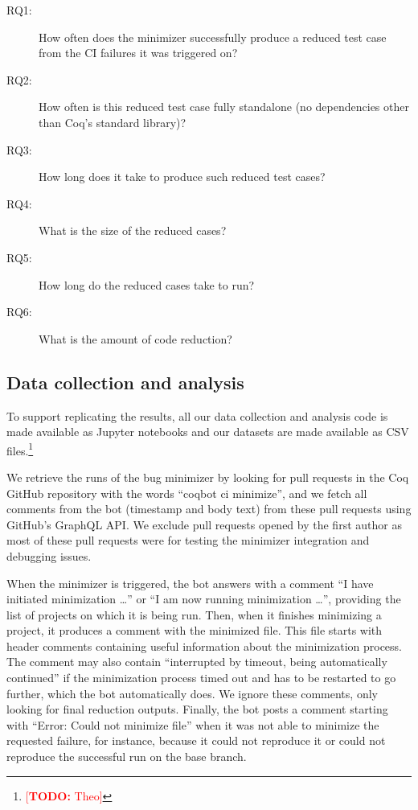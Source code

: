 \documentclass[a4paper,USenglish,cleveref,autoref,thm-restate]{lipics-v2021}
\makeatletter
\newcommand{\todo}[1]{%
\@latex@warning{TODO: \detokenize{#1} on page \thepage}%
\textcolor{red}{[\textbf{TODO:} #1]}}%
\makeatother
\begin{document}
\begin{description}
\item[RQ1:] How often does the minimizer successfully produce a reduced test case from the CI failures it was triggered on?
\item[RQ2:] How often is this reduced test case fully standalone (no dependencies other than Coq's standard library)?
\item[RQ3:] How long does it take to produce such reduced test cases?
\item[RQ4:] What is the size of the reduced cases?
\item[RQ5:] How long do the reduced cases take to run?
\item[RQ6:] What is the amount of code reduction?
\end{description}

\subsection{Data collection and analysis}

To support replicating the results, all our data collection and analysis code is made available as Jupyter notebooks and our datasets are made available as CSV files.\footnote{\todo{Theo}}

We retrieve the runs of the bug minimizer by looking for pull requests in the Coq GitHub repository with the words ``coqbot ci minimize'', and we fetch all comments from the bot (timestamp and body text) from these pull requests using GitHub's GraphQL API.
We exclude pull requests opened by the first author as most of these pull requests were for testing the minimizer integration and debugging issues.

When the minimizer is triggered, the bot answers with a comment ``I have initiated minimization \ldots'' or ``I am now running minimization \ldots'', providing the list of projects on which it is being run.
%
Then, when it finishes minimizing a project, it produces a comment with the minimized file.
%
This file starts with header comments containing useful information about the minimization process. %
%
The comment may also contain ``interrupted by timeout, being automatically continued'' if the minimization process timed out and has to be restarted to go further, which the bot automatically does.
%
We ignore these comments, only looking for final reduction outputs.
%
Finally, the bot posts a comment starting with ``Error: Could not minimize file'' when it was not able to minimize the requested failure, for instance, because it could not reproduce it or could not reproduce the successful run on the base branch.
\end{document}
